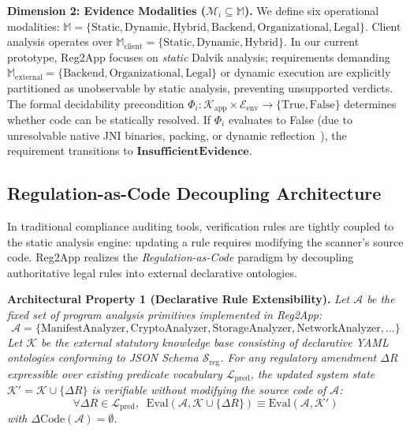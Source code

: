 \noindent\textbf{Dimension 2: Evidence Modalities ($\mathcal{M}_i \subseteq \mathbb{M}$).} We define six operational modalities: $\mathbb{M} = \{\text{Static}, \text{Dynamic}, \text{Hybrid}, \text{Backend}, \text{Organizational}, \text{Legal}\}$. Client analysis operates over $\mathbb{M}_{\text{client}} = \{\text{Static}, \text{Dynamic}, \text{Hybrid}\}$. In our current prototype, Reg2App focuses on \textit{static} Dalvik analysis; requirements demanding $\mathbb{M}_{\text{external}} = \{\text{Backend}, \text{Organizational}, \text{Legal}\}$ or dynamic execution are explicitly partitioned as unobservable by static analysis, preventing unsupported verdicts. The formal decidability precondition $\Phi_i: \mathcal{K}_{\text{app}} \times \mathcal{E}_{\text{env}} \rightarrow \{\text{True}, \text{False}\}$ determines whether code can be statically resolved. If $\Phi_i$ evaluates to False (due to unresolvable native JNI binaries, packing, or dynamic reflection~\cite{octeau_reflection, ernst_static_dynamic}), the requirement transitions to $\mathbf{InsufficientEvidence}$.

\subsection{Regulation-as-Code Decoupling Architecture}
\label{sec:formal:decoupling}

In traditional compliance auditing tools, verification rules are tightly coupled to the static analysis engine: updating a rule requires modifying the scanner's source code. Reg2App realizes the \textit{Regulation-as-Code} paradigm by decoupling authoritative legal rules into external declarative ontologies.

\noindent\textbf{Architectural Property 1 (Declarative Rule Extensibility).}
\textit{Let $\mathcal{A}$ be the fixed set of program analysis primitives implemented in Reg2App:
\begin{equation}
\mathcal{A} = \{\text{ManifestAnalyzer}, \text{CryptoAnalyzer}, \text{StorageAnalyzer}, \text{NetworkAnalyzer}, \dots\}
\end{equation}
Let $\mathcal{K}$ be the external statutory knowledge base consisting of declarative YAML ontologies conforming to JSON Schema $\mathcal{S}_{\text{reg}}$. For any regulatory amendment $\Delta R$ expressible over existing predicate vocabulary $\mathcal{L}_{\text{pred}}$, the updated system state $\mathcal{K}' = \mathcal{K} \cup \{\Delta R\}$ is verifiable without modifying the source code of $\mathcal{A}$:
\begin{equation}
\forall \Delta R \in \mathcal{L}_{\text{pred}}, \;\; \text{Eval}(\mathcal{A}, \mathcal{K} \cup \{\Delta R\}) \equiv \text{Eval}(\mathcal{A}, \mathcal{K}')
\end{equation}
with $\Delta \text{Code}(\mathcal{A}) = \emptyset$.}

